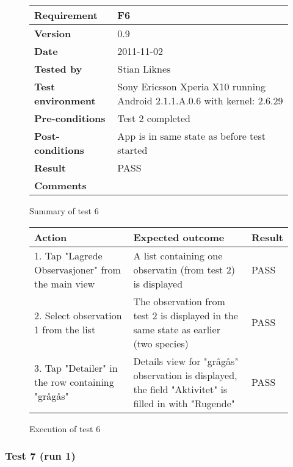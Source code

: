 	\begin{figure}[htb]
		\centering
		\begin{tabular}{|p{3.5cm}|p{7.0cm}|} \hline
			\textbf{Requirement} & F6 \\ \hline
			\textbf{Version} & 0.9 \\ \hline
			\textbf{Date} & 2011-11-02 \\ \hline
			\textbf{Tested by} & Stian Liknes \\ \hline
			\textbf{Test environment} & Sony Ericsson Xperia X10 running Android 2.1.1.A.0.6 with kernel: 2.6.29 \\ \hline
			\textbf{Pre-conditions} & Test 2 completed \\ \hline
			\textbf{Post-conditions} & App is in same state as before test started \\ \hline
			\textbf{Result} & PASS \\ \hline
			\textbf{Comments} & \\ \hline
		\end{tabular}
		\caption{Summary of test 6}
	\end{figure}

	\begin{figure}[htb]
		\centering
		\begin{tabular}{|p{5.0cm}|p{5.0cm}|p{1cm}|}
			\hline \textbf{Action} & \textbf{Expected outcome} & \textbf{Result} \\ \hline
				1. Tap "Lagrede Observasjoner" from the main view &
				A list containing one observatin (from test 2) is displayed &
				PASS \\ \hline

				2. Select observation 1 from the list &
				The observation from test 2 is displayed in the same state as
				earlier (two species) &
				PASS \\ \hline

				3. Tap "Detailer" in the row containing "grågås" &
				Details view for "grågås" observation is displayed, the field "Aktivitet"
				is filled in with "Rugende" &
				PASS \\ \hline
		\end{tabular}
		\caption{Execution of test 6}
	\end{figure}

\newpage
\subsubsection{Test 7 (run 1)}

